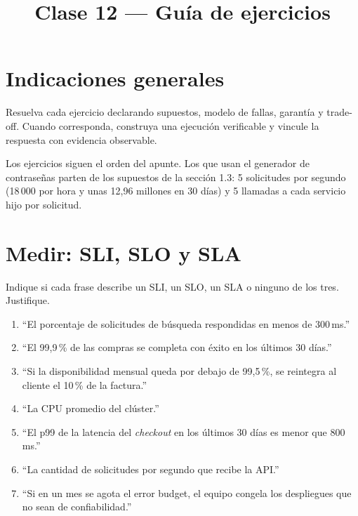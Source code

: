 \documentclass[variant=guia,cover=institutional,mode=screen]{ua-engineering-v6-article}
\title{Clase 12 --- Guía de ejercicios}
\author{\UAProfessor}
\date{\UADate}
\begin{document}
\section{Indicaciones generales}
Resuelva cada ejercicio declarando supuestos, modelo de fallas, garantía y trade-off. Cuando corresponda, construya una ejecución verificable y vincule la respuesta con evidencia observable.

Los ejercicios siguen el orden del apunte. Los que usan el generador de contraseñas parten de los supuestos de la sección 1.3: 5 solicitudes por segundo (18\,000 por hora y unas 12,96 millones en 30 días) y 5 llamadas a cada servicio hijo por solicitud.

\section{Medir: SLI, SLO y SLA}
\begin{uaexercise}
Indique si cada frase describe un SLI, un SLO, un SLA o ninguno de los tres. Justifique.
\begin{enumerate}
\item ``El porcentaje de solicitudes de búsqueda respondidas en menos de 300\,ms.''
\item ``El 99,9\,\% de las compras se completa con éxito en los últimos 30 días.''
\item ``Si la disponibilidad mensual queda por debajo de 99,5\,\%, se reintegra al cliente el 10\,\% de la factura.''
\item ``La CPU promedio del clúster.''
\item ``El p99 de la latencia del \emph{checkout} en los últimos 30 días es menor que 800\,ms.''
\item ``La cantidad de solicitudes por segundo que recibe la API.''
\item ``Si en un mes se agota el error budget, el equipo congela los despliegues que no sean de confiabilidad.''
\end{enumerate}
\end{uaexercise}
\end{document}
